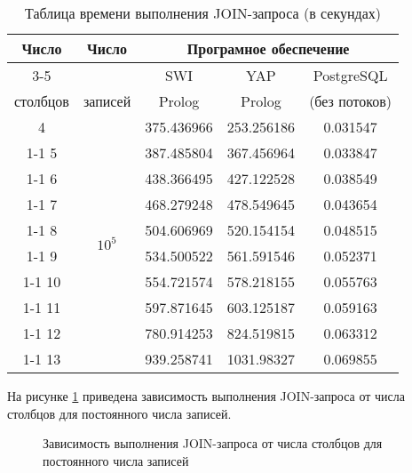 \begin{table}[ht!]
	\centering
	\captionsetup{singlelinecheck = false, justification=raggedright}
	\caption{Таблица времени выполнения JOIN-запроса (в секундах)}
	\label{table:exper_2}
	\begin{tabular}{|c|c|c|c|c|}
		\hline
		\multirow{3}{*}{Число} & \multirow{3}{*}{Число} & \multicolumn{3}{c|}{Програмное обеспечение} \\ \cline{3-5}
		& & SWI & YAP & PostgreSQL\\
		столбцов & записей & Prolog & Prolog & (без потоков) \\ \hline
		4 & \multirow{10}{*}{$10^5$} & 375.436966 & 253.256186 & 0.031547 \\ \cline{1-1} \cline{3-5}
		5 &  & 387.485804 & 367.456964 & 0.033847 \\ \cline{1-1} \cline{3-5}
		6 &  & 438.366495 & 427.122528 & 0.038549 \\ \cline{1-1} \cline{3-5}
		7 &  & 468.279248 & 478.549645 & 0.043654 \\ \cline{1-1} \cline{3-5}
		8 &  & 504.606969  & 520.154154	& 0.048515 \\ \cline{1-1} \cline{3-5}
		9 &  & 534.500522 & 561.591546	& 0.052371 \\ \cline{1-1} \cline{3-5}
		10 &  & 554.721574 & 578.218155	& 0.055763 \\ \cline{1-1} \cline{3-5}
		11 &  & 597.871645	& 603.125187 & 0.059163 \\ \cline{1-1} \cline{3-5}
		12 &  & 780.914253 & 824.519815	& 0.063312 \\ \cline{1-1} \cline{3-5}
		13 &  & 939.258741 & 1031.98327	& 0.069855 \\ \hline
	\end{tabular}
\end{table} 

На рисунке \ref{image:diagram_2} приведена зависимость выполнения JOIN-запроса от числа столбцов для постоянного числа записей.
\begin{figure}[H]
	\centering
	\captionsetup{justification=centering}
	\caption{Зависимость выполнения JOIN-запроса от числа столбцов для постоянного числа записей} 
	\label{image:diagram_2}
\end{figure} 

